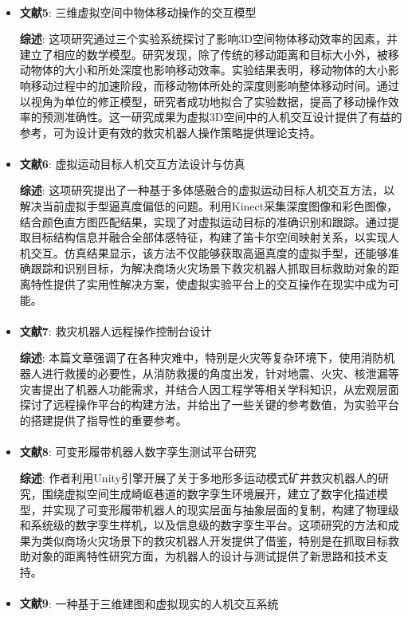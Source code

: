 \documentclass[12pt]{article}  %
\newcommand{\upcite}[1]{\textsuperscript{\textsuperscript{\cite{#1}}}}
\begin{document}
\begin{itemize}[$\blacktriangledown$]
		\item \textbf{文献5\upcite{5}}: 三维虚拟空间中物体移动操作的交互模型
		
		\textbf{综述}: 这项研究通过三个实验系统探讨了影响3D空间物体移动效率的因素，并建立了相应的数学模型。研究发现，除了传统的移动距离和目标大小外，被移动物体的大小和所处深度也影响移动效率。实验结果表明，移动物体的大小影响移动过程中的加速阶段，而移动物体所处的深度则影响整体移动时间。通过以视角为单位的修正模型，研究者成功地拟合了实验数据，提高了移动操作效率的预测准确性。这一研究成果为虚拟3D空间中的人机交互设计提供了有益的参考，可为设计更有效的救灾机器人操作策略提供理论支持。
		
		\item \textbf{文献6\upcite{6}}: 虚拟运动目标人机交互方法设计与仿真
		
		\textbf{综述}: 这项研究提出了一种基于多体感融合的虚拟运动目标人机交互方法，以解决当前虚拟手型逼真度偏低的问题。利用Kinect采集深度图像和彩色图像，结合颜色直方图匹配结果，实现了对虚拟运动目标的准确识别和跟踪。通过提取目标结构信息并融合全部体感特征，构建了笛卡尔空间映射关系，以实现人机交互。仿真结果显示，该方法不仅能够获取高逼真度的虚拟手型，还能够准确跟踪和识别目标，为解决商场火灾场景下救灾机器人抓取目标救助对象的距离特性提供了实用性解决方案，使虚拟实验平台上的交互操作在现实中成为可能。
		
		\item \textbf{文献7\upcite{7}}: 救灾机器人远程操作控制台设计
		
		\textbf{综述}: 本篇文章强调了在各种灾难中，特别是火灾等复杂环境下，使用消防机器人进行救援的必要性，从消防救援的角度出发，针对地震、火灾、核泄漏等灾害提出了机器人功能需求，并结合人因工程学等相关学科知识，从宏观层面探讨了远程操作平台的构建方法，并给出了一些关键的参考数值，为实验平台的搭建提供了指导性的重要参考。
		
		\item \textbf{文献8\upcite{8}}: 可变形履带机器人数字孪生测试平台研究
		
		\textbf{综述}: 作者利用Unity引擎开展了关于多地形多运动模式矿井救灾机器人的研究，围绕虚拟空间生成崎岖巷道的数字孪生环境展开，建立了数字化描述模型，并实现了可变形履带机器人的现实层面与抽象层面的复制，构建了物理级和系统级的数字孪生样机，以及信息级的数字孪生平台。这项研究的方法和成果为类似商场火灾场景下的救灾机器人开发提供了借鉴，特别是在抓取目标救助对象的距离特性研究方面，为机器人的设计与测试提供了新思路和技术支持。
		
		\item \textbf{文献9\upcite{9}}: 一种基于三维建图和虚拟现实的人机交互系统
		

\end{itemize}
\end{document}

